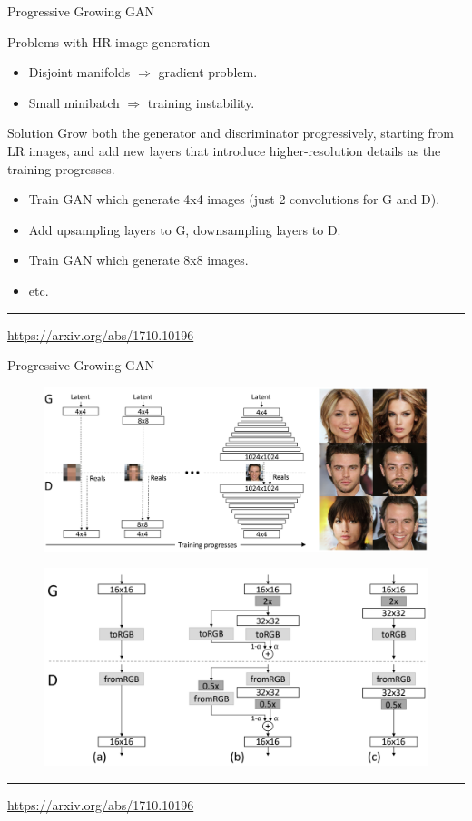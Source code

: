 \documentclass{beamer}
\begin{document}
\begin{frame}{Progressive Growing GAN}
	\begin{block}{Problems with HR image generation}
		\begin{itemize}
			\item Disjoint manifolds $\Rightarrow$ gradient problem.
			\item Small minibatch $\Rightarrow$ training instability.
		\end{itemize}
	\end{block}
	\begin{block}{Solution}
		Grow both the generator and discriminator progressively, starting from LR images, and add new layers that introduce higher-resolution details as the training progresses. 
		\begin{itemize}
			\item Train GAN which generate 4x4 images (just 2 convolutions for G and D).
			\item Add upsampling layers to G, downsampling layers to D.
			\item Train GAN which generate 8x8 images.
			\item etc.
		\end{itemize}
	\end{block}
	
	\vfill
	\hrule\medskip 
	{\scriptsize \href{https://arxiv.org/abs/1710.10196}{https://arxiv.org/abs/1710.10196}}
\end{frame}
\begin{frame}{Progressive Growing GAN}
	\begin{figure}
		\centering
		\includegraphics[width=0.8\linewidth]{figs/pggan_arch}
	\end{figure}
	\begin{figure}
		\centering
		\includegraphics[width=0.6\linewidth]{figs/pggan_fadein}
	\end{figure}
	\vfill
	\hrule\medskip 
	{\scriptsize \href{https://arxiv.org/abs/1710.10196}{https://arxiv.org/abs/1710.10196}}
\end{frame}
\end{document}
